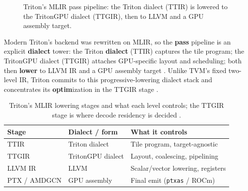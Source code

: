 
\begin{figure}[t]
\centering
{}
\caption{Triton's MLIR pass pipeline: the Triton dialect (TTIR) is lowered to the TritonGPU dialect (TTGIR), then to LLVM and a GPU assembly target.}
\label{fig:triton_arch_passes_architecture}
\end{figure}

Modern Triton's backend was rewritten on MLIR, so the \textbf{pass} pipeline is an explicit \textbf{dialect} tower: the Triton \textbf{dialect} (TTIR) captures the tile program; the TritonGPU dialect (TTGIR) attaches GPU-specific layout and scheduling; both then \textbf{lower} to LLVM IR and a GPU assembly target \citep{tritonlang2024}. Unlike TVM's fixed two-level IR, Triton commits to this progressive-lowering dialect stack and concentrates its \textbf{optim}ization in the TTGIR stage \citep{chen2020compilerbasedhardw,tillet2019triton}.

\begin{table}[t]
\centering
\caption{Triton's MLIR lowering stages and what each level controls; the TTGIR stage is where decode residency is decided \citep{tritonlang2024}.}
\label{tab:ch17_triton_stages}
\begin{tabular}{lll}
\toprule
Stage & Dialect / form & What it controls \\
\midrule
TTIR & Triton dialect & Tile program, target-agnostic \\
TTGIR & TritonGPU dialect & Layout, coalescing, pipelining \\
LLVM IR & LLVM & Scalar/vector lowering, registers \\
PTX / AMDGCN & GPU assembly & Final emit (\texttt{ptxas} / ROCm) \\
\bottomrule
\end{tabular}
\end{table}

